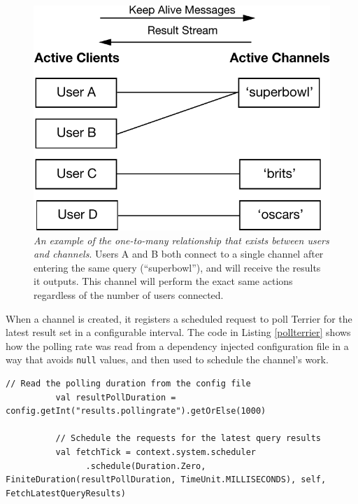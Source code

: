 \documentclass{l4proj}
\newcommand{\code}[1]{\texttt{#1}}
\begin{document}
\begin{figure}
\centering
\includegraphics[scale=0.75]{channels.pdf}
\caption{\textit{An example of the one-to-many relationship that exists between users and channels}. Users A and B both connect to a single channel after entering the same query (``superbowl''), and will receive the results it outputs. This channel will perform the exact same actions regardless of the number of users connected.}
\label{channels}
\end{figure}     
        
        When a channel is created, it registers a scheduled request to poll Terrier for the latest result set in a configurable interval. The code in Listing \ref{pollterrier} shows how the polling rate was read from a dependency injected configuration file in a way that avoids \code{null} values, and then used to schedule the channel's work.
        
        \begin{lstlisting}[caption=Reading configuration from a file and scheduling the updates of results.,label=pollterrier]
          // Read the polling duration from the config file  
          val resultPollDuration = config.getInt("results.pollingrate").getOrElse(1000)
          
          // Schedule the requests for the latest query results
          val fetchTick = context.system.scheduler
                .schedule(Duration.Zero, FiniteDuration(resultPollDuration, TimeUnit.MILLISECONDS), self, FetchLatestQueryResults)
        \end{lstlisting}
\end{document}
